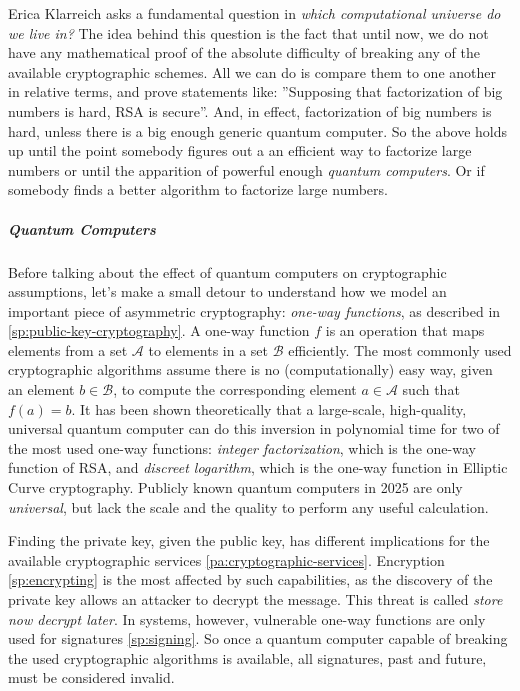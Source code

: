 Erica Klarreich asks a fundamental question in \emph{which computational universe do we live in?}\cite{KlarUniverse22}
The idea behind this question is the fact that until now, we do not have any mathematical proof of the absolute difficulty
of breaking any of the available cryptographic schemes.
All we can do is compare them to one another in relative terms, and prove statements like: 
''Supposing that factorization of big numbers is hard, RSA is secure''.
And, in effect, factorization of big numbers is hard, unless there is a big enough generic quantum computer.
So the above holds up until the point somebody figures out a an efficient way to factorize large numbers or until the apparition of powerful enough \emph{quantum computers}.
Or if somebody finds a better algorithm to factorize large numbers. 

\subparagraph{Quantum Computers}

Before talking about the effect of quantum computers on cryptographic assumptions, let's make a small detour to understand how we model an important piece of asymmetric cryptography: \emph{one-way functions}, as described in
\ref{sp:public-key-cryptography}.
A one-way function $f$ is an operation that maps elements from a set $\mathcal{A}$ to elements in a set $\mathcal{B}$ efficiently. The most commonly used cryptographic algorithms assume there is no (computationally) easy way, given an element $b \in \mathcal{B}$, to compute the corresponding element $a \in \mathcal{A}$ such that $f(a) = b$.
It has been shown theoretically that a large-scale, high-quality, universal
quantum computer \cite[s. 2.1]{TaurusQuantum23} can do this inversion in polynomial time for two of the most used one-way functions: 
\emph{integer factorization}, which is the one-way function of RSA, 
and \emph{discreet logarithm}, which is the one-way function in Elliptic Curve cryptography.
Publicly known quantum computers in 2025 are only \emph{universal}, but lack
the scale and the quality to perform any useful calculation.

Finding the private key, given the public key, has different implications for
the available cryptographic services \ref{pa:cryptographic-services}.
Encryption \ref{sp:encrypting} is the most affected by such capabilities, as the discovery
of the private key allows an attacker to decrypt the message.
This threat is called \emph{store now decrypt later}.
In \eid systems, however, vulnerable one-way functions are only used for
signatures \ref{sp:signing}.
So once a quantum computer capable of breaking the used cryptographic algorithms is
available, all signatures, past and future, must be considered invalid.

